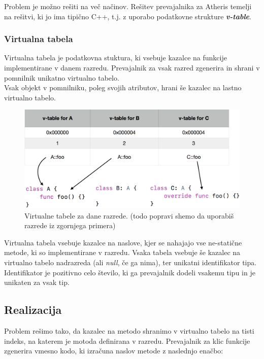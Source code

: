 \documentclass[a4paper, 12p]{book}
\begin{document}
\indent Problem je možno rešiti na več načinov. Rešitev prevajalnika za Atheris temelji na rešitvi, ki jo ima tipično C++, t.j. z uporabo podatkovne strukture \textit{\textbf{v-table}}. 

\subsubsection{Virtualna tabela}

Virtualna tabela je podatkovna stuktura, ki vsebuje kazalce na funkcije implementirane v danem razredu. Prevajalnik za vsak razred zgenerira in shrani v pomnilnik unikatno virtualno tabelo. \\
\indent Vsak objekt v pomnilniku, poleg svojih atributov, hrani še kazalec na lastno virtualno tabelo.

\begin{figure}[h]
	\begin{center}
		\includegraphics[width=1\textwidth]{resources/v-tables.png}
	\end{center}
	\caption{Virtualne tabele za dane razrede. (todo popravi shemo da uporabiš razrede iz zgornjega primera)}
	\label{vtables}
\end{figure}

Virtualna tabela vsebuje kazalce na naslove, kjer se nahajajo vse ne-statične metode, ki so implementirane v razredu. Vsaka tabela vsebuje še kazalec na virtualno tabelo nadrazreda (ali \textit{null}, če ga nima), ter unikatni identifikator tipa. Identifikator je pozitivno celo število, ki ga prevajalnik dodeli vsakemu tipu in je unikaten za vsak tip. \\

\subsection{Realizacija}

Problem rešimo tako, da kazalec na metodo shranimo v virtualno tabelo na tisti indeks, na katerem je motoda definirana v razredu. Prevajalnik za klic funkcije zgenerira vmesno kodo, ki izračuna naslov metode z naslednjo enačbo:
\end{document}

